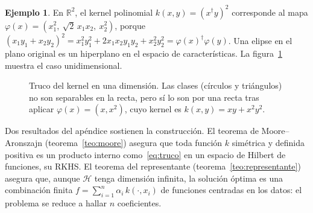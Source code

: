 \documentclass[11pt,a4paper]{article}
\newcommand{\R}{\mathbb{R}}
\newcommand{\Hk}{\mathcal{H}}
\newcommand{\dg}{\dagger}                         %
\theoremstyle{plain}
\theoremstyle{definition}
\newtheorem{ejemplo}[teorema]{Ejemplo}
\theoremstyle{remark}
\numberwithin{equation}{section}
\begin{document}
\begin{ejemplo}
En $\R^2$, el kernel polinomial $k(x,y)=(x^{\dg}y)^2$ corresponde al mapa
$\varphi(x)=(x_1^2,\ \sqrt2\,x_1x_2,\ x_2^2)$, porque
$(x_1y_1+x_2y_2)^2 = x_1^2y_1^2+2x_1x_2y_1y_2+x_2^2y_2^2 = \varphi(x)^{\dg}\varphi(y)$.
Una elipse en el plano original es un hiperplano en el espacio de características.
La figura~\ref{fig:truco} muestra el caso unidimensional.
\end{ejemplo}

\begin{figure}[htbp]
  \centering
  \caption{Truco del kernel en una dimensión. Las clases (círculos y triángulos) no son
  separables en la recta, pero sí lo son por una recta tras aplicar $\varphi(x)=(x,x^2)$,
  cuyo kernel es $k(x,y)=xy+x^2y^2$.}
  \label{fig:truco}
\end{figure}

Dos resultados del apéndice sostienen la construcción. El teorema de Moore--Aronszajn
(teorema~\ref{teo:moore}) asegura que toda función $k$ simétrica y definida positiva es un
producto interno como~\eqref{eq:truco} en un espacio de Hilbert de funciones, su RKHS. El
teorema del representante (teorema~\ref{teo:representante}) asegura que, aunque $\Hk$ tenga
dimensión infinita, la solución óptima es una combinación finita
$f=\sum_{i=1}^n\alpha_i\,k(\cdot,x_i)$ de funciones centradas en los datos: el problema se
reduce a hallar $n$ coeficientes.
\end{document}
